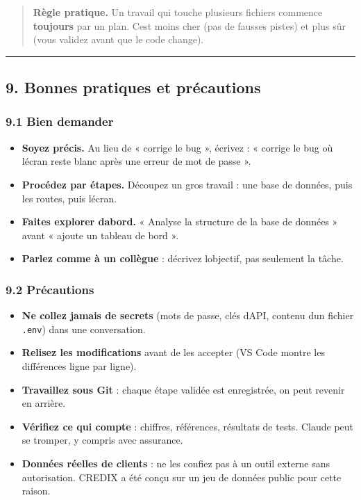 \documentclass[
  french,
  11pt,
  a4paper,
]{article}
\providecommand{\tightlist}{%
  \setlength{\itemsep}{0pt}\setlength{\parskip}{0pt}}
\begin{document}
\begin{quote}
\textbf{Règle pratique.} Un travail qui touche plusieurs fichiers
commence \textbf{toujours} par un plan. C\textquotesingle est moins cher
(pas de fausses pistes) et plus sûr (vous validez avant que le code
change).
\end{quote}

\begin{center}\rule{0.5\linewidth}{0.5pt}\end{center}

\subsection{9. Bonnes pratiques et
précautions}\label{9-bonnes-pratiques-et-pruxe9cautions}

\subsubsection{9.1 Bien demander}\label{91-bien-demander}

\begin{itemize}
\tightlist
\item
  \textbf{Soyez précis.} Au lieu de « corrige le bug », écrivez : «
  corrige le bug où l\textquotesingle écran reste blanc après une erreur
  de mot de passe ».
\item
  \textbf{Procédez par étapes.} Découpez un gros travail : une base de
  données, puis les routes, puis l\textquotesingle écran.
\item
  \textbf{Faites explorer d\textquotesingle abord.} « Analyse la
  structure de la base de données » avant « ajoute un tableau de bord ».
\item
  \textbf{Parlez comme à un collègue} : décrivez
  l\textquotesingle objectif, pas seulement la tâche.
\end{itemize}

\subsubsection{9.2 Précautions}\label{92-pruxe9cautions}

\begin{itemize}
\tightlist
\item
  \textbf{Ne collez jamais de secrets} (mots de passe, clés
  d\textquotesingle API, contenu d\textquotesingle un fichier
  \texttt{.env}) dans une conversation.
\item
  \textbf{Relisez les modifications} avant de les accepter (VS Code
  montre les différences ligne par ligne).
\item
  \textbf{Travaillez sous Git} : chaque étape validée est enregistrée,
  on peut revenir en arrière.
\item
  \textbf{Vérifiez ce qui compte} : chiffres, références, résultats de
  tests. Claude peut se tromper, y compris avec assurance.
\item
  \textbf{Données réelles de clients} : ne les confiez pas à un outil
  externe sans autorisation. CREDIX a été conçu sur un jeu de données
  public pour cette raison.
\end{itemize}
\end{document}
